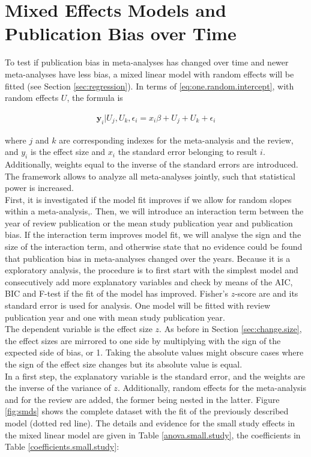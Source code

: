 \documentclass[11pt,a4paper,twoside]{book}\usepackage[]{graphicx}\usepackage[]{color}
\begin{document}
\section{Mixed Effects Models and Publication Bias over Time}
To test if publication bias in meta-analyses has changed over time and newer meta-analyses have less bias, a mixed linear model with random effects will be fitted (see Section \ref{sec:regression}). In terms of \eqref{eq:one.random.intercept}, with random effects $U$, the formula is

\begin{align}
\mathbf{y}_i|U_j,U_k,\epsilon_{i} =  x_i\beta + U_j + U_k + \epsilon_{i} \nonumber
\end{align}

where $j$ and $k$ are corresponding indexes for the meta-analysis and the review, and $y_i$ is the effect size and $x_i$ the standard error belonging to result $i$. Additionally, weights equal to the inverse of the standard errors are introduced. The framework allows to analyze all meta-analyses jointly, such that statistical power is increased.\\   
First, it is investigated if the model fit improves if we allow for random slopes within a meta-analysis,. Then, we will introduce an interaction term between the year of review publication or the mean study publication year and publication bias. If the interaction term improves model fit, we will analyse the sign and the size of the interaction term, and otherwise state that no evidence could be found that publication bias in meta-analyses changed over the years. Because it is a exploratory analysis, the procedure is to first start with the simplest model and consecutively add more explanatory variables and check by means of the AIC, BIC and F-test if the fit of the model has improved. Fisher's $z$-score are and its standard error is used for analysis. One model will be fitted with review publication year and one with mean study publication year.\\
The dependent variable is the effect size $z$. As before in Section \ref{sec:change.size}, the effect sizes are mirrored to one side by multiplying with the sign of the expected side of bias,  or 1. Taking the absolute values might obscure cases where the sign of the effect size changes but its absolute value is equal.\\
In a first step, the explanatory variable is the standard error, and the weights are the inverse of the variance of $z$. Additionally, random effects for the meta-analysis and for the review are added, the former being nested in the latter. Figure \ref{fig:smds} shows the complete dataset with the fit of the previously described model (dotted red line). The details and evidence for the small study effects in the mixed linear model are given in Table \ref{anova.small.study}, the coefficients in Table \ref{coefficients.small.study}:
\end{document}
